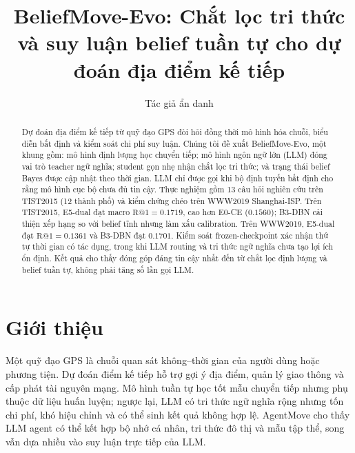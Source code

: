 \documentclass[runningheads]{llncs}
\makeatletter
\newcommand{\Rone}{\mathrm{R@1}}
\newcommand{\method}{BeliefMove-Evo}
\makeatother
\begin{document}
\title{BeliefMove-Evo: Chắt lọc tri thức và suy luận belief tuần tự cho dự đoán địa điểm kế tiếp}

\author{Tác giả ẩn danh}

\maketitle

\begin{abstract}
Dự đoán địa điểm kế tiếp từ quỹ đạo GPS đòi hỏi đồng thời mô hình hóa chuỗi, biểu diễn bất định và kiểm soát chi phí suy luận. Chúng tôi đề xuất \method, một khung gồm: mô hình định lượng học chuyển tiếp; mô hình ngôn ngữ lớn (LLM) đóng vai trò teacher ngữ nghĩa; student gọn nhẹ nhận chắt lọc tri thức; và trạng thái belief Bayes được cập nhật theo thời gian. LLM chỉ được gọi khi bộ định tuyến bất định cho rằng mô hình cục bộ chưa đủ tin cậy. Thực nghiệm gồm 13 câu hỏi nghiên cứu trên TIST2015 (12 thành phố) và kiểm chứng chéo trên WWW2019 Shanghai-ISP. Trên TIST2015, E5-dual đạt macro $\Rone=0.1719$, cao hơn E0-CE ($0.1560$); B3-DBN cải thiện xếp hạng so với belief tĩnh nhưng làm xấu calibration. Trên WWW2019, E5-dual đạt $\Rone=0.1361$ và B3-DBN đạt $0.1701$. Kiểm soát frozen-checkpoint xác nhận thứ tự thời gian có tác dụng, trong khi LLM routing và tri thức ngữ nghĩa chưa tạo lợi ích ổn định. Kết quả cho thấy đóng góp đáng tin cậy nhất đến từ chắt lọc định lượng và belief tuần tự, không phải tăng số lần gọi LLM.

\end{abstract}

\section{Giới thiệu}

Một quỹ đạo GPS là chuỗi quan sát không--thời gian của người dùng hoặc phương tiện. Dự đoán điểm kế tiếp hỗ trợ gợi ý địa điểm, quản lý giao thông và cấp phát tài nguyên mạng. Mô hình tuần tự học tốt mẫu chuyển tiếp nhưng phụ thuộc dữ liệu huấn luyện; ngược lại, LLM có tri thức ngữ nghĩa rộng nhưng tốn chi phí, khó hiệu chỉnh và có thể sinh kết quả không hợp lệ. AgentMove \cite{feng2025agentmove} cho thấy LLM agent có thể kết hợp bộ nhớ cá nhân, tri thức đô thị và mẫu tập thể, song vẫn dựa nhiều vào suy luận trực tiếp của LLM.
\end{document}
